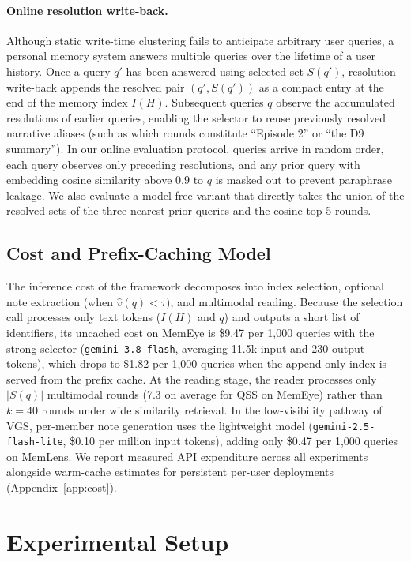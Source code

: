 \documentclass[10pt]{article}
\newcommand{\qss}{QSS}
\begin{document}
\paragraph{Online resolution write-back.} Although static write-time clustering fails to anticipate arbitrary user queries, a personal memory system answers multiple queries over the lifetime of a user history. Once a query $q'$ has been answered using selected set $S(q')$, resolution write-back appends the resolved pair $(q', S(q'))$ as a compact entry at the end of the memory index $I(H)$. Subsequent queries $q$ observe the accumulated resolutions of earlier queries, enabling the selector to reuse previously resolved narrative aliases (such as which rounds constitute ``Episode 2'' or ``the D9 summary''). In our online evaluation protocol, queries arrive in random order, each query observes only preceding resolutions, and any prior query with embedding cosine similarity above $0.9$ to $q$ is masked out to prevent paraphrase leakage. We also evaluate a model-free variant that directly takes the union of the resolved sets of the three nearest prior queries and the cosine top-5 rounds.

\subsection{Cost and Prefix-Caching Model}
\label{sec:costmodel}

The inference cost of the framework decomposes into index selection, optional note extraction (when $\hat{v}(q) < \tau$), and multimodal reading. Because the selection call processes only text tokens ($I(H)$ and $q$) and outputs a short list of identifiers, its uncached cost on MemEye is \$9.47 per 1,000 queries with the strong selector (\texttt{gemini-3.8-flash}, averaging 11.5k input and 230 output tokens), which drops to \$1.82 per 1,000 queries when the append-only index is served from the prefix cache. At the reading stage, the reader processes only $|S(q)|$ multimodal rounds (7.3 on average for \qss{} on MemEye) rather than $k{=}40$ rounds under wide similarity retrieval. In the low-visibility pathway of VGS, per-member note generation uses the lightweight model (\texttt{gemini-2.5-flash-lite}, \$0.10 per million input tokens), adding only \$0.47 per 1,000 queries on MemLens. We report measured API expenditure across all experiments alongside warm-cache estimates for persistent per-user deployments (Appendix~\ref{app:cost}).

\section{Experimental Setup}
\label{sec:setup}
\end{document}
